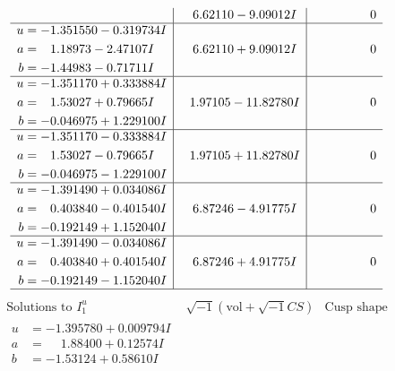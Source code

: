 \documentclass[1p]{elsarticle_modified}
\theoremstyle{definition}
\newcommand{\I}{\sqrt{-1}}
\begin{document}
$$\begin{array}{c|c|c}
 & \phantom{-}6.62110 - 9.09012 I & \phantom{-0.000000 } 0 \\ \hline\begin{aligned}
u &= -1.351550 - 0.319734 I \\
a &= \phantom{-}1.18973 - 2.47107 I \\
b &= -1.44983 - 0.71711 I\end{aligned}
 & \phantom{-}6.62110 + 9.09012 I & \phantom{-0.000000 } 0 \\ \hline\begin{aligned}
u &= -1.351170 + 0.333884 I \\
a &= \phantom{-}1.53027 + 0.79665 I \\
b &= -0.046975 + 1.229100 I\end{aligned}
 & \phantom{-}1.97105 - 11.82780 I & \phantom{-0.000000 } 0 \\ \hline\begin{aligned}
u &= -1.351170 - 0.333884 I \\
a &= \phantom{-}1.53027 - 0.79665 I \\
b &= -0.046975 - 1.229100 I\end{aligned}
 & \phantom{-}1.97105 + 11.82780 I & \phantom{-0.000000 } 0 \\ \hline\begin{aligned}
u &= -1.391490 + 0.034086 I \\
a &= \phantom{-}0.403840 - 0.401540 I \\
b &= -0.192149 + 1.152040 I\end{aligned}
 & \phantom{-}6.87246 - 4.91775 I & \phantom{-0.000000 } 0 \\ \hline\begin{aligned}
u &= -1.391490 - 0.034086 I \\
a &= \phantom{-}0.403840 + 0.401540 I \\
b &= -0.192149 - 1.152040 I\end{aligned}
 & \phantom{-}6.87246 + 4.91775 I & \phantom{-0.000000 } 0\\
 \hline 
 \end{array}$$\newpage$$\begin{array}{c|c|c}  
\text{Solutions to }I^u_{1}& \I (\text{vol} + \sqrt{-1}CS) & \text{Cusp shape}\\
 \hline 
\begin{aligned}
u &= -1.395780 + 0.009794 I \\
a &= \phantom{-}1.88400 + 0.12574 I \\
b &= -1.53124 + 0.58610 I\end{aligned}

\end{array}$$
\end{document}
